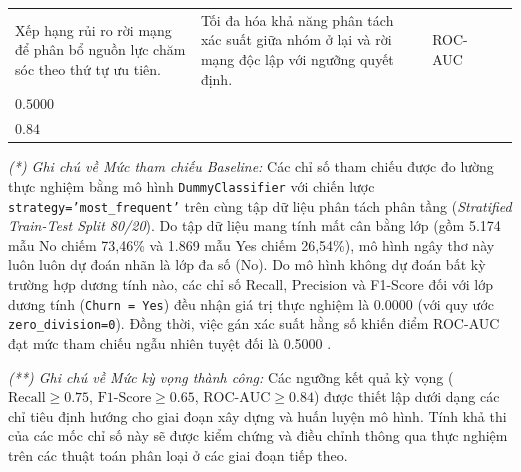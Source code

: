 \documentclass[a4paper]{article}
\begin{document}
\begin{table}[H]
\begin{tabularx}{\textwidth}{| >{\raggedright\arraybackslash}p{2.8cm} | >{\raggedright\arraybackslash}X | >{\centering\arraybackslash}p{2.0cm} | >{\centering\arraybackslash}p{3.1cm} | >{\centering\arraybackslash}p{3.1cm} |}
\hline
Xếp hạng rủi ro rời mạng để phân bổ nguồn lực chăm sóc theo thứ tự ưu tiên. & Tối đa hóa khả năng phân tách xác suất giữa nhóm ở lại và rời mạng độc lập với ngưỡng quyết định. & ROC-AUC & \makecell{$\text{ROC-AUC} =$\\$0.5000$} & \makecell{$\text{ROC-AUC} \ge$\\$0.84$} \\
\hline
\end{tabularx}
\end{table}

\noindent \textit{(*) Ghi chú về Mức tham chiếu Baseline:} Các chỉ số tham chiếu được đo lường thực nghiệm bằng mô hình \texttt{DummyClassifier} với chiến lược \texttt{strategy='most\_frequent'} trên cùng tập dữ liệu phân tách phân tầng (\textit{Stratified Train-Test Split 80/20}). Do tập dữ liệu mang tính mất cân bằng lớp (gồm 5.174 mẫu No chiếm 73,46\% và 1.869 mẫu Yes chiếm 26,54\%), mô hình ngây thơ này luôn luôn dự đoán nhãn là lớp đa số (No). Do mô hình không dự đoán bất kỳ trường hợp dương tính nào, các chỉ số Recall, Precision và F1-Score đối với lớp dương tính (\texttt{Churn = Yes}) đều nhận giá trị thực nghiệm là 0.0000 (với quy ước \texttt{zero\_division=0}). Đồng thời, việc gán xác suất hằng số khiến điểm ROC-AUC đạt mức tham chiếu ngẫu nhiên tuyệt đối là 0.5000 \cite{fawcett2006roc}.

\noindent \textit{(**) Ghi chú về Mức kỳ vọng thành công:} Các ngưỡng kết quả kỳ vọng ($\text{Recall} \ge 0.75$, $\text{F1-Score} \ge 0.65$, $\text{ROC-AUC} \ge 0.84$) được thiết lập dưới dạng các chỉ tiêu định hướng cho giai đoạn xây dựng và huấn luyện mô hình. Tính khả thi của các mốc chỉ số này sẽ được kiểm chứng và điều chỉnh thông qua thực nghiệm trên các thuật toán phân loại ở các giai đoạn tiếp theo.
\end{document}
